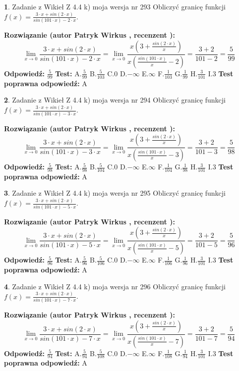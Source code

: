 \documentclass[12pt, a4paper]{article}
\theoremstyle{definition} %
\newtheorem{zad}{}
\newcommand{\zadStart}[1]{\begin{zad}#1\newline}
\newcommand{\zadStop}{\end{zad}}
\newcommand{\rozwStart}[2]{\noindent \textbf{Rozwiązanie (autor #1 , recenzent #2): }\newline}
\newcommand{\rozwStop}{\newline}
\newcommand{\odpStart}{\noindent \textbf{Odpowiedź:}\newline}
\newcommand{\odpStop}{\newline}
\newcommand{\testStart}{\noindent \textbf{Test:}\newline}
\newcommand{\testStop}{\newline}
\newcommand{\kluczStart}{\noindent \textbf{Test poprawna odpowiedź:}\newline}
\newcommand{\kluczStop}{\newline}
\begin{document}
\zadStart{Zadanie z Wikieł Z 4.4 k) moja wersja nr 293}
Obliczyć granicę funkcji $f(x)=\frac{3\cdot x +sin(2\cdot x)}{sin(101\cdot x) -2\cdot x}$.
\zadStop
\rozwStart{Patryk Wirkus}{}
$$\lim\limits_{x\to 0}\frac{3\cdot x +sin(2\cdot x)}{sin(101\cdot x) -2\cdot x}
=\lim\limits_{x\to 0}\frac{x(3+\frac{sin(2\cdot x)}{x})}{x(\frac{sin(101\cdot x)}{x}-2)}
=\frac{3+2}{101-2} = \frac{5}{99}$$
\rozwStop
\odpStart
$\frac{5}{99}$
\odpStop
\testStart
A.$\frac{5}{99}$
B.$\frac{5}{103}$
C.$0$
D.$-\infty$
E.$\infty$
F.$\frac{1}{103}$
G.$\frac{1}{99}$
H.$\frac{3}{101}$
I.$3$
\testStop
\kluczStart
A
\kluczStop



\zadStart{Zadanie z Wikieł Z 4.4 k) moja wersja nr 294}
Obliczyć granicę funkcji $f(x)=\frac{3\cdot x +sin(2\cdot x)}{sin(101\cdot x) -3\cdot x}$.
\zadStop
\rozwStart{Patryk Wirkus}{}
$$\lim\limits_{x\to 0}\frac{3\cdot x +sin(2\cdot x)}{sin(101\cdot x) -3\cdot x}
=\lim\limits_{x\to 0}\frac{x(3+\frac{sin(2\cdot x)}{x})}{x(\frac{sin(101\cdot x)}{x}-3)}
=\frac{3+2}{101-3} = \frac{5}{98}$$
\rozwStop
\odpStart
$\frac{5}{98}$
\odpStop
\testStart
A.$\frac{5}{98}$
B.$\frac{5}{104}$
C.$0$
D.$-\infty$
E.$\infty$
F.$\frac{1}{104}$
G.$\frac{1}{98}$
H.$\frac{3}{101}$
I.$3$
\testStop
\kluczStart
A
\kluczStop



\zadStart{Zadanie z Wikieł Z 4.4 k) moja wersja nr 295}
Obliczyć granicę funkcji $f(x)=\frac{3\cdot x +sin(2\cdot x)}{sin(101\cdot x) -5\cdot x}$.
\zadStop
\rozwStart{Patryk Wirkus}{}
$$\lim\limits_{x\to 0}\frac{3\cdot x +sin(2\cdot x)}{sin(101\cdot x) -5\cdot x}
=\lim\limits_{x\to 0}\frac{x(3+\frac{sin(2\cdot x)}{x})}{x(\frac{sin(101\cdot x)}{x}-5)}
=\frac{3+2}{101-5} = \frac{5}{96}$$
\rozwStop
\odpStart
$\frac{5}{96}$
\odpStop
\testStart
A.$\frac{5}{96}$
B.$\frac{5}{106}$
C.$0$
D.$-\infty$
E.$\infty$
F.$\frac{1}{106}$
G.$\frac{1}{96}$
H.$\frac{3}{101}$
I.$3$
\testStop
\kluczStart
A
\kluczStop



\zadStart{Zadanie z Wikieł Z 4.4 k) moja wersja nr 296}
Obliczyć granicę funkcji $f(x)=\frac{3\cdot x +sin(2\cdot x)}{sin(101\cdot x) -7\cdot x}$.
\zadStop
\rozwStart{Patryk Wirkus}{}
$$\lim\limits_{x\to 0}\frac{3\cdot x +sin(2\cdot x)}{sin(101\cdot x) -7\cdot x}
=\lim\limits_{x\to 0}\frac{x(3+\frac{sin(2\cdot x)}{x})}{x(\frac{sin(101\cdot x)}{x}-7)}
=\frac{3+2}{101-7} = \frac{5}{94}$$
\rozwStop
\odpStart
$\frac{5}{94}$
\odpStop
\testStart
A.$\frac{5}{94}$
B.$\frac{5}{108}$
C.$0$
D.$-\infty$
E.$\infty$
F.$\frac{1}{108}$
G.$\frac{1}{94}$
H.$\frac{3}{101}$
I.$3$
\testStop
\kluczStart
A
\kluczStop
\end{document}
